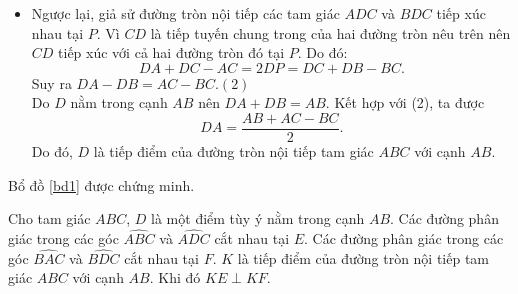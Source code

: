 \begin{bt}
{\begin{itemize}
			$$2DP=DC+DA-AC\mathop  = \limits^{\text{do}\,\,(1)} DC+DB-BC.$$
			Suy ra, $P$ là tiếp điểm của đường tròn nội tiếp tam giác $BCD$ với cạnh $CD$.
			Như vậy, các đường tròn nội tiếp các tam giác $ADC$ và $BDC$ cùng tiếp xúc $CD$ tại $P$; vì thế, chúng tiếp xúc nhau.
			\item Ngược lại, giả sử đường tròn nội tiếp các tam giác $ADC$ và $BDC$ tiếp xúc nhau tại $P$.
			Vì $CD$ là tiếp tuyến chung trong của hai đường tròn nêu trên nên $CD$ tiếp xúc với cả hai đường tròn đó tại $P$. Do đó:
			$$DA+DC-AC=2DP=DC+DB-BC.$$
			Suy ra $DA-DB=AC-BC$.\hfill$(2)$\\
			Do $D$ nằm trong cạnh $AB$ nên
			$DA+DB=AB.$
			Kết hợp với (2), ta được
			$$DA=\dfrac{AB+AC-BC}{2}.$$
			Do đó, $D$ là tiếp điểm của đường tròn nội tiếp tam giác $ABC$ với cạnh $AB$.
		\end{itemize}
		Bổ đồ \ref{bd1} được chứng minh.
		\begin{bode}[2]\label{bd2}
			Cho tam giác $ABC$, $D$ là một điểm tùy ý nằm trong cạnh $AB$. Các đường phân giác trong các góc $\widehat{ABC}$ và $\widehat{ADC}$ cắt nhau tại $E$. Các đường phân giác trong các góc $\widehat{BAC}$ và $\widehat{BDC}$ cắt nhau tại $F$. $K$ là tiếp điểm của đường tròn nội tiếp tam giác $ABC$ với cạnh $AB$. Khi đó $KE\perp KF$.
		\end{bode}
		\begin{center}
\end{center}}
\end{bt}
